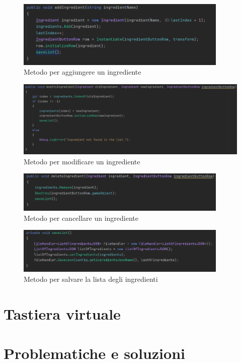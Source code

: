 \begin{figure}[H]
    \centering
    \includegraphics[width=0.9\textwidth,height=\textheight,keepaspectratio]{figures/chapter_1/addIngredient_CODICE.png}
    \caption{Metodo per aggiungere un ingrediente}
    \label{fig:addIngredient}
\end{figure}
\begin{figure}[H]
    \centering
    \includegraphics[width=1\textwidth,height=\textheight,keepaspectratio]{figures/chapter_1/modifyIngredient_CODICE.png}
    \caption{Metodo per modificare un ingrediente}
    \label{fig:modifyIngredient}
\end{figure}
\begin{figure}[H]
    \centering
    \includegraphics[width=0.9\textwidth,height=\textheight,keepaspectratio]{figures/chapter_1/deleteIngredient_CODICE.png}
    \caption{Metodo per cancellare un ingrediente}
    \label{fig:deleteIngredient}
\end{figure}
\begin{figure}[H]
    \centering
    \includegraphics[width=0.9\textwidth,height=\textheight,keepaspectratio]{figures/chapter_1/saveList_LISTA_CODICE.png}
    \caption{Metodo per salvare la lista degli ingredienti}
    \label{fig:saveListScrollList}
\end{figure}



\section{Tastiera virtuale}
\section{Problematiche e soluzioni} 
